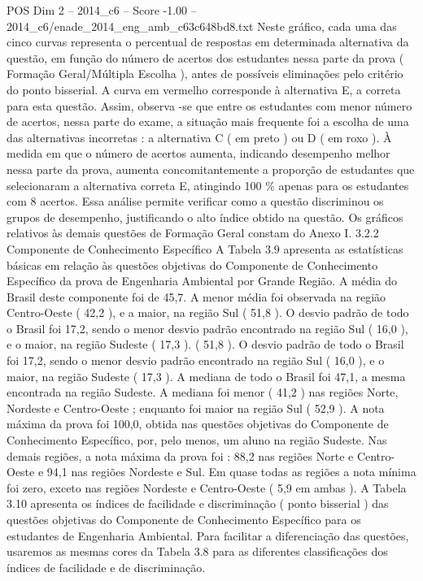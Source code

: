 \begin{textsample}{POS Dim 2 – 2014\_c6 – Score -1.00 – 2014\_c6/enade\_2014\_eng\_amb\_c63c648bd8.txt}
Neste gráfico, cada uma das cinco curvas representa o percentual de respostas em determinada alternativa da questão, em função do número de acertos dos estudantes nessa parte da prova ( Formação Geral/Múltipla Escolha ), antes de possíveis eliminações pelo critério do ponto bisserial.
A curva em vermelho corresponde à alternativa E, a correta para esta questão.
Assim, observa -se que entre os estudantes com menor número de acertos, nessa parte do exame, a situação mais frequente foi a escolha de uma das alternativas incorretas : a alternativa C ( em preto ) ou D ( em roxo ).
À medida em que o número de acertos aumenta, indicando desempenho melhor nessa parte da prova, aumenta concomitantemente a proporção de estudantes que selecionaram a alternativa correta E, atingindo 100 \% apenas para os estudantes com 8 acertos.
Essa análise permite verificar como a questão discriminou os grupos de desempenho, justificando o alto índice obtido na questão.
Os gráficos relativos às demais questões de Formação Geral constam do Anexo I. 3.2.2 Componente de Conhecimento Específico A Tabela 3.9 apresenta as estatísticas básicas em relação às questões objetivas do Componente de Conhecimento Específico da prova de Engenharia Ambiental por Grande Região.
A média do Brasil deste componente foi de 45,7.
A menor média foi observada na região Centro-Oeste ( 42,2 ), e a maior, na região Sul ( 51,8 ).
O desvio padrão de todo o Brasil foi 17,2, sendo o menor desvio padrão encontrado na região Sul ( 16,0 ), e o maior, na região Sudeste ( 17,3 ). ( 51,8 ).
O desvio padrão de todo o Brasil foi 17,2, sendo o menor desvio padrão encontrado na região Sul ( 16,0 ), e o maior, na região Sudeste ( 17,3 ).
A mediana de todo o Brasil foi 47,1, a mesma encontrada na região Sudeste.
A mediana foi menor ( 41,2 ) nas regiões Norte, Nordeste e Centro-Oeste ; enquanto foi maior na região Sul ( 52,9 ).
A nota máxima da prova foi 100,0, obtida nas questões objetivas do Componente de Conhecimento Específico, por, pelo menos, um aluno na região Sudeste.
Nas demais regiões, a nota máxima da prova foi : 88,2 nas regiões Norte e Centro-Oeste e 94,1 nas regiões Nordeste e Sul.
Em quase todas as regiões a nota mínima foi zero, exceto nas regiões Nordeste e Centro-Oeste ( 5,9 em ambas ).
A Tabela 3.10 apresenta os índices de facilidade e discriminação ( ponto bisserial ) das questões objetivas do Componente de Conhecimento Específico para os estudantes de Engenharia Ambiental.
Para facilitar a diferenciação das questões, usaremos as mesmas cores da Tabela 3.8 para as diferentes classificações dos índices de facilidade e de discriminação.

\end{textsample}
